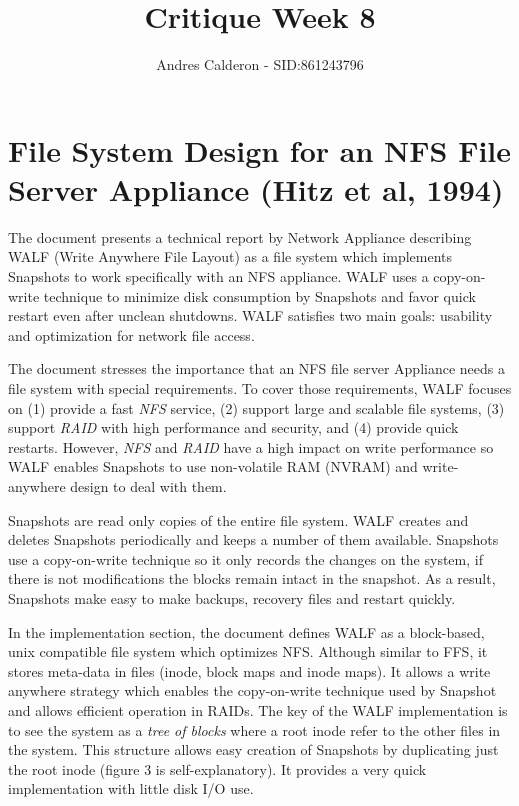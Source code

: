 \documentclass[a4paper,10pt]{scrartcl}
\title{Critique Week 8}
\author{Andres Calderon - SID:861243796}
\begin{document}
\maketitle
\thispagestyle{empty}

\section*{File System Design for an NFS File Server Appliance (Hitz et al, 1994)}
The document presents a technical report by Network Appliance describing WALF (Write Anywhere File Layout) as a file system which implements Snapshots to work specifically with an NFS appliance.  WALF uses a copy-on-write technique to minimize disk consumption by Snapshots and favor quick restart even after unclean shutdowns.  WALF satisfies two main goals: usability and optimization for network file access.

The document stresses the importance that an NFS file server Appliance needs a file system with special requirements.  To cover those requirements, WALF focuses on (1) provide a fast \textit{NFS} service, (2) support large and scalable file systems, (3) support \textit{RAID} with high performance and security, and (4) provide quick restarts.  However, \textit{NFS} and \textit{RAID} have a high impact on write performance so WALF enables Snapshots to use non-volatile RAM (NVRAM) and write-anywhere design  to deal with them.

Snapshots are read only copies of the entire file system.  WALF creates and deletes Snapshots periodically and keeps a number of them available.  Snapshots use a copy-on-write technique so it only records the changes on the system, if there is not modifications the blocks remain intact in the snapshot.  As a result, Snapshots make easy to make backups, recovery files and restart quickly.

In the implementation section, the document defines WALF as a block-based, unix compatible file system which optimizes NFS.  Although similar to FFS, it stores meta-data in files (inode, block maps and inode maps).  It allows a write anywhere strategy which enables the copy-on-write technique used by Snapshot and allows efficient operation in RAIDs. The key of the WALF implementation is to see the system as a \textit{tree of blocks} where a root inode refer to the other files in the system.  This structure allows easy creation of Snapshots by duplicating just the root inode (figure 3 is self-explanatory).  It provides a very quick implementation with little disk I/O use.
\end{document}
